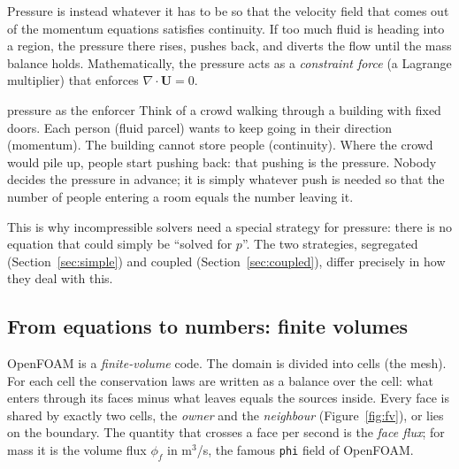 \documentclass[11pt,a4paper]{article}
\newcommand{\vect}[1]{\mathbf{#1}}
\newcommand{\Uv}{\vect{U}}
\newcommand{\code}[1]{\texttt{#1}}
\begin{document}
Pressure is instead whatever it has to be so that the velocity field that
comes out of the momentum equations satisfies continuity. If too much fluid
is heading into a region, the pressure there rises, pushes back, and
diverts the flow until the mass balance holds. Mathematically, the pressure
acts as a \emph{constraint force} (a Lagrange multiplier) that enforces
$\nabla\cdot\Uv=0$.

\begin{intuition}{pressure as the enforcer}
  Think of a crowd walking through a building with fixed doors. Each person
  (fluid parcel) wants to keep going in their direction (momentum). The
  building cannot store people (continuity). Where the crowd would pile up,
  people start pushing back: that pushing is the pressure. Nobody decides
  the pressure in advance; it is simply whatever push is needed so that the
  number of people entering a room equals the number leaving it.
\end{intuition}

This is why incompressible solvers need a special strategy for pressure:
there is no equation that could simply be ``solved for $p$''. The two
strategies, segregated (Section~\ref{sec:simple}) and coupled
(Section~\ref{sec:coupled}), differ precisely in how they deal with this.

\subsection{From equations to numbers: finite volumes}\label{sec:fv}

OpenFOAM is a \emph{finite-volume} code. The domain is divided into cells
(the mesh). For each cell the conservation laws are written as a balance
over the cell: what enters through its faces minus what leaves equals the
sources inside. Every face is shared by exactly two cells, the
\emph{owner} and the \emph{neighbour} (Figure~\ref{fig:fv}), or lies on the
boundary. The quantity that crosses a face per second is the \emph{face
flux}; for mass it is the volume flux $\phi_f$ in m$^3$/s, the famous
\code{phi} field of OpenFOAM.
\end{document}
